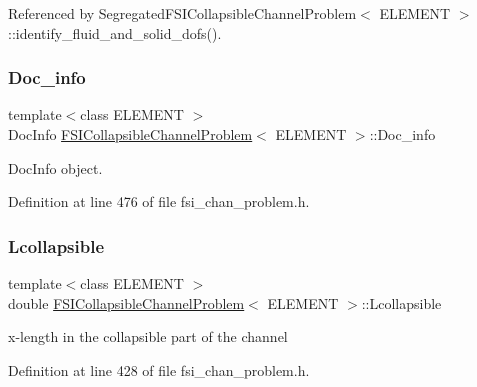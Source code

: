Referenced by Segregated\+F\+S\+I\+Collapsible\+Channel\+Problem$<$ E\+L\+E\+M\+E\+N\+T $>$\+::identify\+\_\+fluid\+\_\+and\+\_\+solid\+\_\+dofs().

\mbox{\label{classFSICollapsibleChannelProblem_a31ea75b732e42eec45f333a26d6cb2ac}} 
\subsubsection{\texorpdfstring{Doc\+\_\+info}{Doc\_info}}
{\footnotesize\ttfamily template$<$class E\+L\+E\+M\+E\+NT $>$ \\
Doc\+Info \hyperlink{classFSICollapsibleChannelProblem}{F\+S\+I\+Collapsible\+Channel\+Problem}$<$ E\+L\+E\+M\+E\+NT $>$\+::Doc\+\_\+info\hspace{0.3cm}{\ttfamily [protected]}}



Doc\+Info object. 



Definition at line 476 of file fsi\+\_\+chan\+\_\+problem.\+h.

\mbox{\label{classFSICollapsibleChannelProblem_ae6ce3834d06f0fb75db945a782ff0108}} 
\subsubsection{\texorpdfstring{Lcollapsible}{Lcollapsible}}
{\footnotesize\ttfamily template$<$class E\+L\+E\+M\+E\+NT $>$ \\
double \hyperlink{classFSICollapsibleChannelProblem}{F\+S\+I\+Collapsible\+Channel\+Problem}$<$ E\+L\+E\+M\+E\+NT $>$\+::Lcollapsible\hspace{0.3cm}{\ttfamily [protected]}}



x-\/length in the collapsible part of the channel 



Definition at line 428 of file fsi\+\_\+chan\+\_\+problem.\+h.

